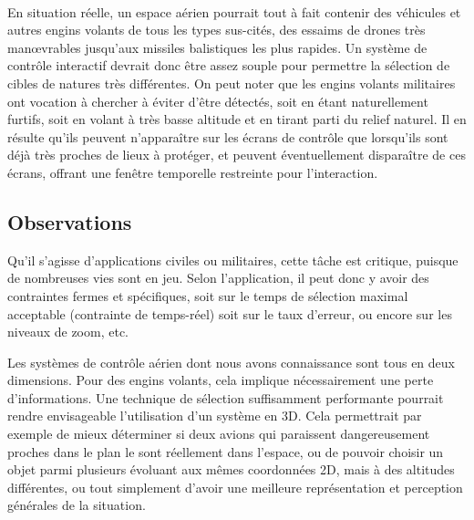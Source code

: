 	\paragraph{}
	En situation réelle, un espace aérien pourrait tout à fait contenir des véhicules et autres engins volants de tous les types sus-cités, des essaims de drones très manœvrables jusqu'aux missiles balistiques les plus rapides. Un système de contrôle interactif devrait donc être assez souple pour permettre la sélection de cibles de natures très différentes.
	On peut noter que les engins volants militaires ont vocation à chercher à éviter d'être détectés, soit en étant naturellement furtifs, soit en volant à très basse altitude et en tirant parti du relief naturel. Il en résulte qu'ils peuvent n'apparaître sur les écrans de contrôle que lorsqu'ils sont déjà très proches de lieux à protéger, et peuvent éventuellement disparaître de ces écrans, offrant une fenêtre temporelle restreinte pour l'interaction.
	
	\subsection{Observations}
	Qu'il s'agisse d'applications civiles ou militaires, cette tâche est critique, puisque de nombreuses vies sont en jeu. Selon l'application, il peut donc y avoir des contraintes fermes et spécifiques, soit sur le temps de sélection maximal acceptable (contrainte de temps-réel) soit sur le taux d'erreur, ou encore sur les niveaux de zoom, etc.

	Les systèmes de contrôle aérien dont nous avons connaissance sont tous en deux dimensions. Pour des engins volants, cela implique nécessairement une perte d'informations. Une technique de sélection suffisamment performante pourrait rendre envisageable l'utilisation d'un système en 3D. Cela permettrait par exemple de mieux déterminer si deux avions qui paraissent dangereusement proches dans le plan le sont réellement dans l'espace, ou de pouvoir choisir un objet parmi plusieurs évoluant aux mêmes coordonnées 2D, mais à des altitudes différentes, ou tout simplement d'avoir une meilleure représentation et perception générales de la situation.

